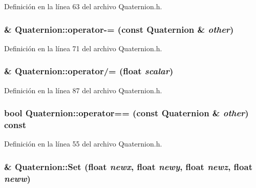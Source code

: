 Definición en la línea 63 del archivo Quaternion.h.

\hypertarget{struct_quaternion_a682c2bc53ef117e70dd633271ddd65b4}{
\subsubsection[{operator-\/=}]{ \& Quaternion::operator-\/= (const {\bf Quaternion} \& {\em other})}}
\label{struct_quaternion_a682c2bc53ef117e70dd633271ddd65b4}


Definición en la línea 71 del archivo Quaternion.h.

\hypertarget{struct_quaternion_a860018754b065c76851616d54d01cff7}{
\subsubsection[{operator/=}]{ \& Quaternion::operator/= (float {\em scalar})}}
\label{struct_quaternion_a860018754b065c76851616d54d01cff7}


Definición en la línea 87 del archivo Quaternion.h.

\hypertarget{struct_quaternion_a42082dbdbebe3a9b2cadd10a8b3f767b}{
\subsubsection[{operator==}]{\setlength{\rightskip}{0pt plus 5cm}bool Quaternion::operator== (const {\bf Quaternion} \& {\em other}) const}}
\label{struct_quaternion_a42082dbdbebe3a9b2cadd10a8b3f767b}


Definición en la línea 55 del archivo Quaternion.h.

\hypertarget{struct_quaternion_a35bfd6227bb768e4cb6439b330cd6a4b}{
\subsubsection[{Set}]{ \& Quaternion::Set (float {\em newx}, \/  float {\em newy}, \/  float {\em newz}, \/  float {\em neww})}}
\label{struct_quaternion_a35bfd6227bb768e4cb6439b330cd6a4b}


